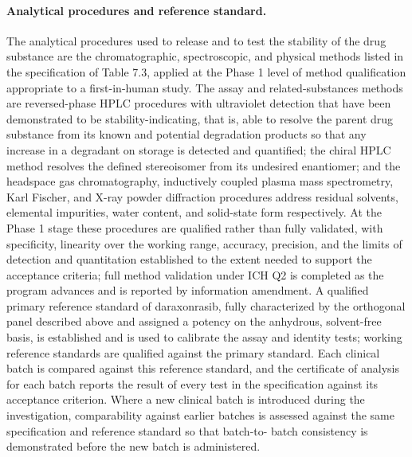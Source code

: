\paragraph{Analytical procedures and reference standard.}
The analytical procedures used to release and to test the stability of the drug
substance are the chromatographic, spectroscopic, and physical methods listed in
the specification of Table 7.3, applied at the Phase 1 level of method
qualification appropriate to a first-in-human study. The assay and
related-substances methods are reversed-phase HPLC procedures with ultraviolet
detection that have been demonstrated to be stability-indicating, that is, able to
resolve the parent drug substance from its known and potential degradation
products so that any increase in a degradant on storage is detected and
quantified; the chiral HPLC method resolves the defined stereoisomer from its
undesired enantiomer; and the headspace gas chromatography, inductively coupled
plasma mass spectrometry, Karl Fischer, and X-ray powder diffraction procedures
address residual solvents, elemental impurities, water content, and solid-state
form respectively. At the Phase 1 stage these procedures are qualified rather than
fully validated, with specificity, linearity over the working range, accuracy,
precision, and the limits of detection and quantitation established to the extent
needed to support the acceptance criteria; full method validation under ICH Q2 is
completed as the program advances and is reported by information amendment. A
qualified primary reference standard of daraxonrasib, fully characterized by the
orthogonal panel described above and assigned a potency on the anhydrous,
solvent-free basis, is established and is used to calibrate the assay and identity
tests; working reference standards are qualified against the primary standard.
Each clinical batch is compared against this reference standard, and the
certificate of analysis for each batch reports the result of every test in the
specification against its acceptance criterion. Where a new clinical batch is
introduced during the investigation, comparability against earlier batches is
assessed against the same specification and reference standard so that batch-to-
batch consistency is demonstrated before the new batch is administered.

